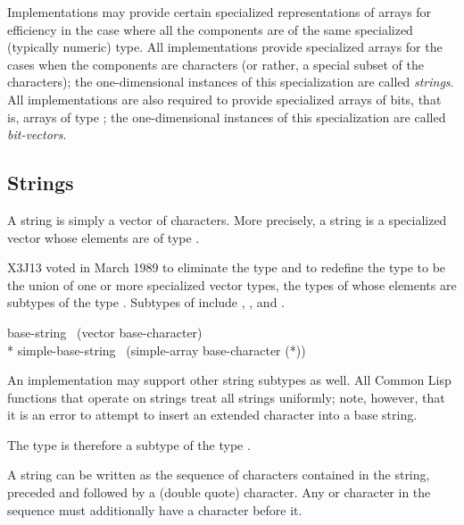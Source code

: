{Implementations may provide certain specialized representations of
arrays for efficiency in the case where all the components are of
the same specialized (typically numeric) type.  All implementations
provide specialized arrays for the cases when the components
are characters (or rather, a special subset of the characters);
the one-dimensional instances of
this specialization are called {\it strings}.
All implementations are also required to provide specialized arrays
of bits, that is, arrays of type ;
the one-dimensional instances of
this specialization are called {\it bit-vectors}.

\subsection{Strings}
\label{STRING-TYPE-SECTION}

\begin{obsolete}
A string is simply a vector of characters.
More precisely, a string is a specialized vector whose elements
are of type .
\end{obsolete}
\begin{newer}
X3J13 voted in March 1989 
to eliminate the type  and to redefine the type
 to be the union of one or more specialized vector
types, the types of whose elements are subtypes of the type .
Subtypes of  include , ,
and .

\vskip 3pt
\begin{lisp}
base-string \EQ\ (vector base-character) \\*
simple-base-string \EQ\ (simple-array base-character (*))
\end{lisp}
An implementation may support
other string subtypes as well.  All Common Lisp functions that operate
on strings treat all strings uniformly; note, however,
that it is an error to attempt to insert
an extended character into a base string.
\end{newer}

\newpage%

The type  is therefore a subtype of the type .

A string can be written as the sequence of characters contained in the
string, preceded and followed by a  (double quote) character.
Any  or \cd{{\Xbackslash}} character in the sequence must additionally
have a \cd{{\Xbackslash}} character before it.

}
